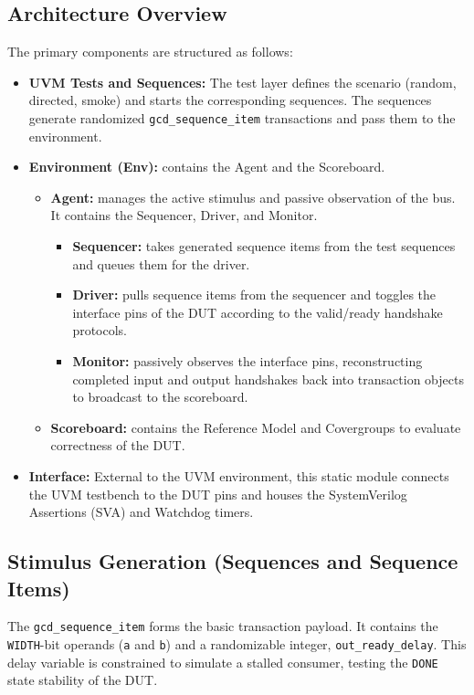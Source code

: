 \subsection{Architecture Overview}
The primary components are structured as follows:
\begin{itemize}
    \item \textbf{UVM Tests and Sequences:} The test layer defines the scenario (random, directed, smoke) and starts the corresponding sequences. The sequences generate randomized \texttt{gcd\_sequence\_item} transactions and pass them to the environment.
    \item \textbf{Environment (Env):} contains the Agent and the Scoreboard.
    \begin{itemize}
        \item \textbf{Agent:} manages the active stimulus and passive observation of the bus. It contains the Sequencer, Driver, and Monitor.
        \begin{itemize}
            \item \textbf{Sequencer:} takes generated sequence items from the test sequences and queues them for the driver.
            \item \textbf{Driver:} pulls sequence items from the sequencer and toggles the interface pins of the DUT according to the valid/ready handshake protocols.
            \item \textbf{Monitor:} passively observes the interface pins, reconstructing completed input and output handshakes back into transaction objects to broadcast to the scoreboard.
        \end{itemize}
        \item \textbf{Scoreboard:} contains the Reference Model and Covergroups to evaluate correctness of the DUT. 
    \end{itemize}
    \item \textbf{Interface:} External to the UVM environment, this static module connects the UVM testbench to the DUT pins and houses the SystemVerilog Assertions (SVA) and Watchdog timers.
\end{itemize}

\subsection{Stimulus Generation (Sequences and Sequence Items)}
The \texttt{gcd\_sequence\_item} forms the basic transaction payload. It contains the \texttt{WIDTH}-bit operands (\texttt{a} and \texttt{b}) and a randomizable integer, \texttt{out\_ready\_delay}. This delay variable is constrained to simulate a stalled consumer, testing the \texttt{DONE} state stability of the DUT.

